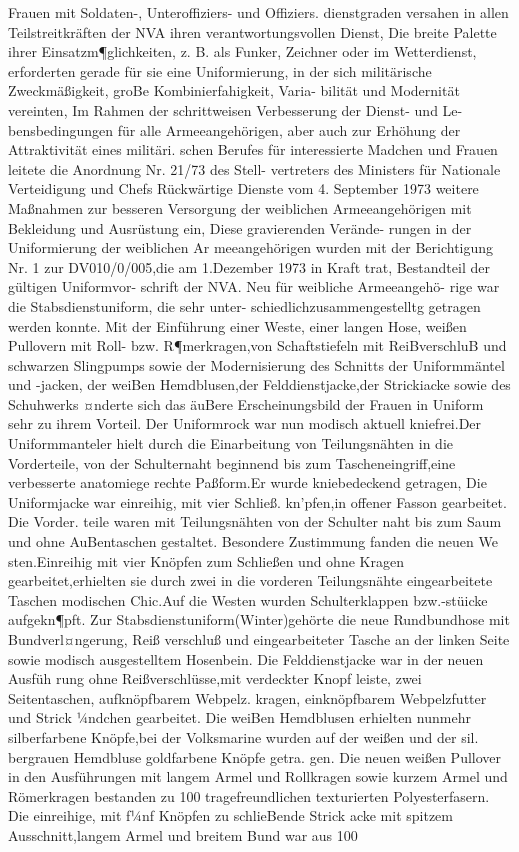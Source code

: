

Frauen mit Soldaten-, Unteroffiziers- und Offiziers.
dienstgraden versahen in allen Teilstreitkräften der
NVA ihren verantwortungsvollen Dienst, Die breite
Palette ihrer Einsatzm¶glichkeiten, z. B. als Funker,
Zeichner oder im Wetterdienst, erforderten gerade
für sie eine Uniformierung, in der sich militärische
Zweckmäßigkeit, groBe Kombinierfahigkeit, Varia-
bilität und Modernität vereinten, Im Rahmen der
schrittweisen Verbesserung der Dienst- und Le-
bensbedingungen für alle Armeeangehörigen, aber auch zur Erhöhung der Attraktivität eines militäri.
schen Berufes für interessierte Madchen und
Frauen leitete die Anordnung Nr. 21/73 des Stell-
vertreters des Ministers für Nationale Verteidigung
und Chefs Rückwärtige Dienste vom 4. September
1973 weitere Maßnahmen zur besseren Versorgung
der weiblichen Armeeangehörigen mit Bekleidung
und Ausrüstung ein, Diese gravierenden Verände-
rungen in der Uniformierung der weiblichen Ar
meeangehörigen wurden mit der Berichtigung Nr. 1
zur DV010/0/005,die am 1.Dezember 1973 in
Kraft trat, Bestandteil der gültigen Uniformvor-
schrift der NVA. Neu für weibliche Armeeangehö-
rige war die Stabsdienstuniform, die sehr unter-
schiedlichzusammengestelltg
getragen
werden
konnte.
Mit der Einführung einer Weste, einer langen
Hose, weißen Pullovern mit Roll- bzw. R¶merkragen,von Schaftstiefeln mit ReiBverschluB und
schwarzen Slingpumps sowie der Modernisierung
des Schnitts der Uniformmäntel und -jacken, der
weiBen Hemdblusen,der Felddienstjacke,der
Strickiacke sowie des Schuhwerks ¤nderte sich das
äuBere Erscheinungsbild der Frauen in Uniform
sehr zu ihrem Vorteil. Der Uniformrock war nun
modisch aktuell kniefrei.Der Uniformmanteler
hielt durch die Einarbeitung von Teilungsnähten in
die Vorderteile, von der Schulternaht beginnend bis
zum Tascheneingriff,eine verbesserte anatomiege
rechte Paßform.Er wurde kniebedeckend getragen,
Die Uniformjacke war einreihig, mit vier Schließ.
kn'pfen,in offener Fasson gearbeitet. Die Vorder.
teile waren mit Teilungsnähten von der Schulter
naht bis zum Saum und ohne AuBentaschen
gestaltet.
Besondere Zustimmung fanden die neuen We
sten.Einreihig mit vier Knöpfen zum Schließen
und ohne Kragen gearbeitet,erhielten sie durch
zwei in die vorderen Teilungsnähte eingearbeitete
Taschen modischen Chic.Auf die Westen wurden
Schulterklappen bzw.-stüicke aufgekn¶pft.
Zur Stabsdienstuniform(Winter)gehörte die
neue Rundbundhose mit Bundverl¤ngerung, Reiß
verschluß und eingearbeiteter Tasche an der linken
Seite sowie modisch ausgestelltem Hosenbein.
Die Felddienstjacke war in der neuen Ausfüh
rung ohne Reißverschlüsse,mit verdeckter Knopf
leiste, zwei Seitentaschen, aufknöpfbarem Webpelz.
kragen, einknöpfbarem Webpelzfutter und Strick
¼ndchen gearbeitet. Die weiBen Hemdblusen
erhielten nunmehr silberfarbene Knöpfe,bei der
Volksmarine wurden auf der weißen und der sil.
bergrauen Hemdbluse goldfarbene Knöpfe getra.
gen.
Die neuen weißen Pullover in den Ausführungen
mit langem Armel und Rollkragen sowie kurzem
Armel und Römerkragen bestanden zu 100%
tragefreundlichen texturierten Polyesterfasern. Die
einreihige, mit f¼nf Knöpfen zu schlieBende Strick
acke mit spitzem Ausschnitt,langem Armel und
breitem Bund war aus 100%

